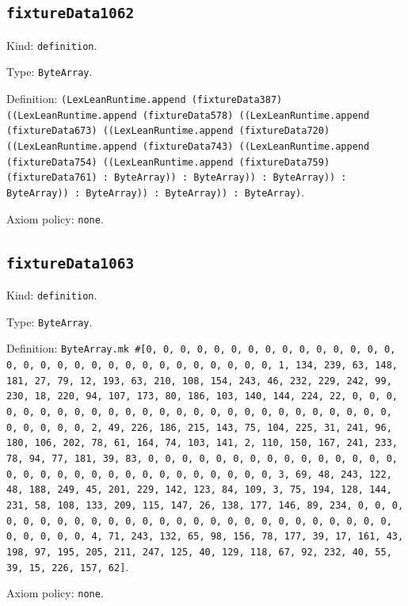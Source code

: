 \documentclass[11pt]{article}
\begin{document}
\subsection*{\texttt{fixtureData1062}}
\noindent Kind: \texttt{definition}.\par
\noindent Type: \texttt{ByteArray}.\par
\noindent Definition: \texttt{(LexLeanRuntime.append (fixtureData387) ((LexLeanRuntime.append (fixtureData578) ((LexLeanRuntime.append (fixtureData673) ((LexLeanRuntime.append (fixtureData720) ((LexLeanRuntime.append (fixtureData743) ((LexLeanRuntime.append (fixtureData754) ((LexLeanRuntime.append (fixtureData759) (fixtureData761) : ByteArray)) : ByteArray)) : ByteArray)) : ByteArray)) : ByteArray)) : ByteArray)) : ByteArray)}.\par
\noindent Axiom policy: \texttt{none}.\par
\subsection*{\texttt{fixtureData1063}}
\noindent Kind: \texttt{definition}.\par
\noindent Type: \texttt{ByteArray}.\par
\noindent Definition: \texttt{ByteArray.mk \#[0, 0, 0, 0, 0, 0, 0, 0, 0, 0, 0, 0, 0, 0, 0, 0, 0, 0, 0, 0, 0, 0, 0, 0, 0, 0, 0, 0, 0, 0, 0, 1, 134, 239, 63, 148, 181, 27, 79, 12, 193, 63, 210, 108, 154, 243, 46, 232, 229, 242, 99, 230, 18, 220, 94, 107, 173, 80, 186, 103, 140, 144, 224, 22, 0, 0, 0, 0, 0, 0, 0, 0, 0, 0, 0, 0, 0, 0, 0, 0, 0, 0, 0, 0, 0, 0, 0, 0, 0, 0, 0, 0, 0, 0, 0, 2, 49, 226, 186, 215, 143, 75, 104, 225, 31, 241, 96, 180, 106, 202, 78, 61, 164, 74, 103, 141, 2, 110, 150, 167, 241, 233, 78, 94, 77, 181, 39, 83, 0, 0, 0, 0, 0, 0, 0, 0, 0, 0, 0, 0, 0, 0, 0, 0, 0, 0, 0, 0, 0, 0, 0, 0, 0, 0, 0, 0, 0, 0, 0, 3, 69, 48, 243, 122, 48, 188, 249, 45, 201, 229, 142, 123, 84, 109, 3, 75, 194, 128, 144, 231, 58, 108, 133, 209, 115, 147, 26, 138, 177, 146, 89, 234, 0, 0, 0, 0, 0, 0, 0, 0, 0, 0, 0, 0, 0, 0, 0, 0, 0, 0, 0, 0, 0, 0, 0, 0, 0, 0, 0, 0, 0, 0, 0, 4, 71, 243, 132, 65, 98, 156, 78, 177, 39, 17, 161, 43, 198, 97, 195, 205, 211, 247, 125, 40, 129, 118, 67, 92, 232, 40, 55, 39, 15, 226, 157, 62]}.\par
\noindent Axiom policy: \texttt{none}.\par
\end{document}
